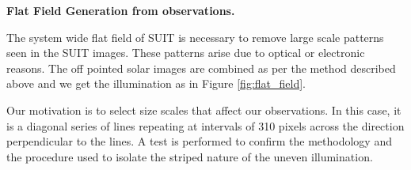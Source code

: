 \documentclass[11pt,a4paper]{article}
\begin{document}
\begin{center}
		\Large \textbf{Flat Field Generation from observations.}
\end{center}
	The system wide flat field of SUIT is necessary to remove large scale patterns seen in the SUIT images. These patterns 	arise due to optical or electronic reasons. The off pointed solar images are combined as per the method described above and we get the illumination as in Figure \ref{fig:flat_field}. 
	
	Our motivation is to select size scales that affect our observations. In this case, it is a diagonal series of lines repeating at intervals of 310 pixels across the direction perpendicular to the lines. A test is performed to confirm the methodology and the procedure used to isolate the striped nature of the uneven illumination.
	
\end{document}

